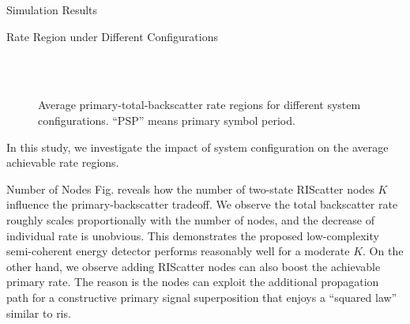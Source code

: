\documentclass[journal]{IEEEtran}
\begin{document}
\begin{section}{Simulation Results}
	\begin{subsection}{Rate Region under Different Configurations}
		\begin{figure}[!t]
			\centering
			\\
			\\
			\caption{
				Average primary-total-backscatter rate regions for different system configurations.
				``PSP'' means primary symbol period.
			}
			\label{fg:region_config}
		\end{figure}
		In this study, we investigate the impact of system configuration on the average achievable rate regions.
		\begin{subsubsection}{Number of Nodes}
			Fig.  reveals how the number of two-state RIScatter nodes $K$ influence the primary-backscatter tradeoff.
			We observe the total backscatter rate roughly scales proportionally with the number of nodes, and the decrease of individual rate is unobvious.
			This demonstrates the proposed low-complexity semi-coherent energy detector performs reasonably well for a moderate $K$.
			On the other hand, we observe adding RIScatter nodes can also boost the achievable primary rate.
			The reason is the nodes can exploit the additional propagation path for a constructive primary signal superposition that enjoys a ``squared law'' similar to \gls{ris}.
		\end{subsubsection}


\end{subsection}
\end{section}
\end{document}
